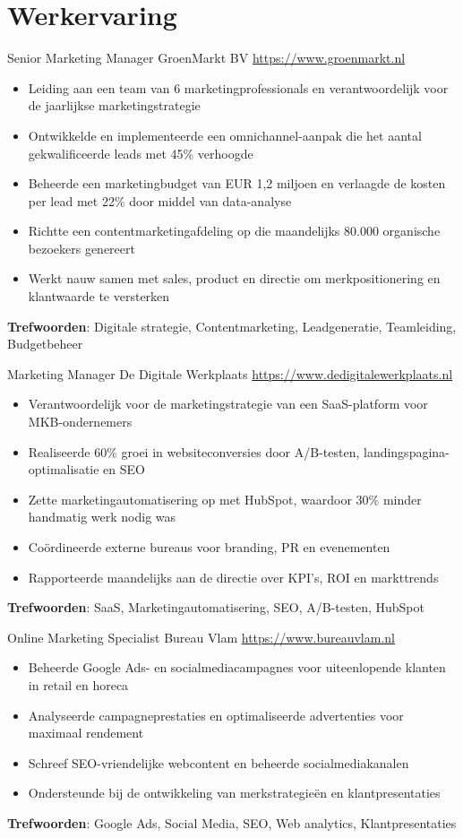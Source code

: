 \documentclass[a4paper, serif, 10pt]{moderncv}
\begin{document}
\section{Werkervaring}

        {Senior Marketing Manager}
        {GroenMarkt BV}
        {\url{https://www.groenmarkt.nl}}
        {}
        {\begin{itemize}
\item Leiding aan een team van 6 marketingprofessionals en verantwoordelijk voor de jaarlijkse marketingstrategie
\item Ontwikkelde en implementeerde een omnichannel-aanpak die het aantal gekwalificeerde leads met 45\% verhoogde
\item Beheerde een marketingbudget van EUR 1,2 miljoen en verlaagde de kosten per lead met 22\% door middel van data-analyse
\item Richtte een contentmarketingafdeling op die maandelijks 80.000 organische bezoekers genereert
\item Werkt nauw samen met sales, product en directie om merkpositionering en klantwaarde te versterken
\end{itemize}
\textbf{Trefwoorden}: Digitale strategie, Contentmarketing, Leadgeneratie, Teamleiding, Budgetbeheer}

        {Marketing Manager}
        {De Digitale Werkplaats}
        {\url{https://www.dedigitalewerkplaats.nl}}
        {}
        {\begin{itemize}
\item Verantwoordelijk voor de marketingstrategie van een SaaS-platform voor MKB-ondernemers
\item Realiseerde 60\% groei in websiteconversies door A/B-testen, landingspagina-optimalisatie en SEO
\item Zette marketingautomatisering op met HubSpot, waardoor 30\% minder handmatig werk nodig was
\item Coördineerde externe bureaus voor branding, PR en evenementen
\item Rapporteerde maandelijks aan de directie over KPI's, ROI en markttrends
\end{itemize}
\textbf{Trefwoorden}: SaaS, Marketingautomatisering, SEO, A/B-testen, HubSpot}

        {Online Marketing Specialist}
        {Bureau Vlam}
        {\url{https://www.bureauvlam.nl}}
        {}
        {\begin{itemize}
\item Beheerde Google Ads- en socialmediacampagnes voor uiteenlopende klanten in retail en horeca
\item Analyseerde campagneprestaties en optimaliseerde advertenties voor maximaal rendement
\item Schreef SEO-vriendelijke webcontent en beheerde socialmediakanalen
\item Ondersteunde bij de ontwikkeling van merkstrategieën en klantpresentaties
\end{itemize}
\textbf{Trefwoorden}: Google Ads, Social Media, SEO, Web analytics, Klantpresentaties}
\end{document}
